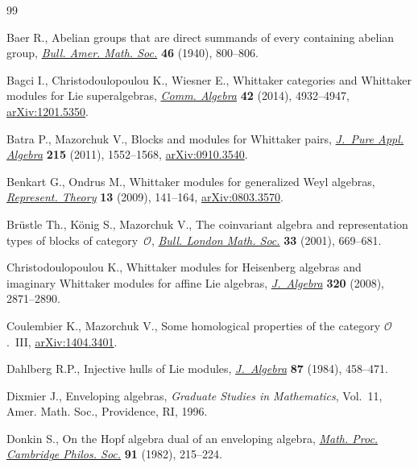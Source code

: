 \documentclass[pdftex]{sigma}
\begin{document}
\begin{thebibliography}{99}
\footnotesize \itemsep=0pt

Baer R., Abelian groups that are direct summands of every containing abelian
  group, \href{http://dx.doi.org/10.1090/S0002-9904-1940-07306-9}{\textit{Bull. Amer. Math. Soc.}} \textbf{46} (1940), 800--806.

Bagci I., Christodoulopoulou K., Wiesner E., Whittaker categories and
  {W}hittaker modules for {L}ie superalgebras, \href{http://dx.doi.org/10.1080/00927872.2013.827692}{\textit{Comm. Algebra}}
  \textbf{42} (2014), 4932--4947, \href{http://arxiv.org/abs/1201.5350}{arXiv:1201.5350}.

Batra P., Mazorchuk V., Blocks and modules for {W}hittaker pairs,
  \href{http://dx.doi.org/10.1016/j.jpaa.2010.09.010}{\textit{J.~Pure Appl. Algebra}} \textbf{215} (2011), 1552--1568,
  \href{http://arxiv.org/abs/0910.3540}{arXiv:0910.3540}.

Benkart G., Ondrus M., Whittaker modules for generalized {W}eyl algebras,
  \href{http://dx.doi.org/10.1090/S1088-4165-09-00347-1}{\textit{Represent. Theory}} \textbf{13} (2009), 141--164, \href{http://arxiv.org/abs/0803.3570}{arXiv:0803.3570}.

Br{\"u}stle Th., K{\"o}nig S., Mazorchuk V., The coinvariant algebra and
  representation types of blocks of category~{${\mathcal O}$}, \href{http://dx.doi.org/10.1112/S0024609301008529}{\textit{Bull.
  London Math. Soc.}} \textbf{33} (2001), 669--681.

Christodoulopoulou K., Whittaker modules for {H}eisenberg algebras and
  imaginary {W}hittaker modules for af\/f\/ine {L}ie algebras, \href{http://dx.doi.org/10.1016/j.jalgebra.2008.06.025}{\textit{J.~Algebra}}
  \textbf{320} (2008), 2871--2890.

Coulembier K., Mazorchuk V., Some homological properties of the category
  {${\mathcal O}$}.~{III}, \href{http://arxiv.org/abs/1404.3401}{arXiv:1404.3401}.

Dahlberg R.P., Injective hulls of {L}ie modules, \href{http://dx.doi.org/10.1016/0021-8693(84)90149-2}{\textit{J.~Algebra}}
  \textbf{87} (1984), 458--471.

Dixmier J., Enveloping algebras, \textit{Graduate Studies in Mathematics},
  Vol.~11, Amer. Math. Soc., Providence, RI, 1996.

Donkin S., On the {H}opf algebra dual of an enveloping algebra, \href{http://dx.doi.org/10.1017/S0305004100059260}{\textit{Math.
  Proc. Cambridge Philos. Soc.}} \textbf{91} (1982), 215--224.


\end{thebibliography}
\end{document}
